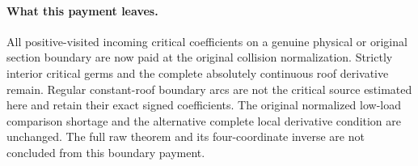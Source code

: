 \paragraph{What this payment leaves.}
All positive-visited incoming critical coefficients on a genuine
physical or original section boundary are now paid at the original
collision normalization. Strictly interior critical germs and the
complete absolutely continuous roof derivative remain.
Regular constant-roof boundary arcs are not the critical source
estimated here and retain their exact signed coefficients.
The original normalized low-load comparison shortage and the
alternative complete local derivative condition are unchanged.
The full raw theorem and its four-coordinate inverse are not
concluded from this boundary payment.

